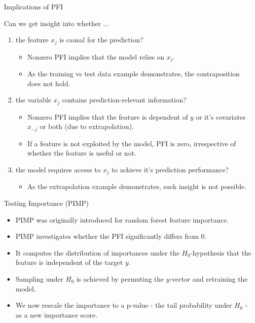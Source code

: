 \documentclass[11pt,compress,t,notes=noshow, aspectratio=169, xcolor=table]{beamer}
\begin{document}
\begin{vbframe}{Implications of PFI}

Can we get insight into whether ...

\begin{enumerate}
    \item the feature $x_j$ is causal for the prediction?
    \begin{itemize}
      \item Nonzero PFI implies that the model relies on $x_j$.
      \item As the training vs test data example demonstrates, the contraposition does not hold.
    \end{itemize}
    \item the variable $x_j$ contains prediction-relevant information?
    \begin{itemize}
      \item Nonzero PFI implies that the feature is dependent of $y$ or it's covariates $x_{-j}$ or both (due to extrapolation).
      \item If a feature is not exploited by the model, PFI is zero, irrespective of whether the feature is useful or not.
    \end{itemize}
    \item the model requires access to $x_j$ to achieve it's prediction performance?    
    \begin{itemize}
      \item As the extrapolation example demonstrates, such insight is not possible.
\end{itemize}
\end{enumerate}
\end{vbframe}


\begin{vbframe}{Testing Importance (PIMP) }

\begin{itemize}
  \item PIMP was originally introduced for random forest feature importance.
  \item PIMP investigates whether the PFI significantly differs from 0. 
  \item It computes the distribution of importances under the $H_0$-hypothesis that the feature is independent of the target $y$.
  \item Sampling under $H_0$ is achieved by permuting the $y$-vector and retraining the model.
  \item We now rescale the importance to a p-value - the tail probability under $H_0$ - as a new importance score.
\end{itemize}


\end{vbframe}
\end{document}
